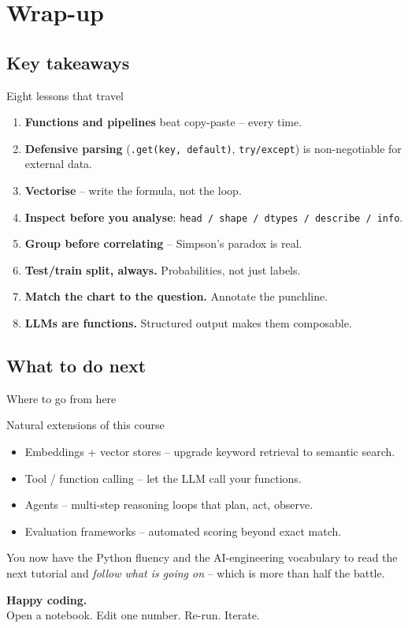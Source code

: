 \documentclass[aspectratio=169,11pt]{beamer}
\begin{document}
\section{Wrap-up}

\subsection{Key takeaways}

\begin{frame}{Eight lessons that travel}
  \begin{enumerate}
    \item \textbf{Functions and pipelines} beat copy-paste -- every time.
    \item \textbf{Defensive parsing} (\texttt{.get(key, default)}, \texttt{try/except}) is non-negotiable for external data.
    \item \textbf{Vectorise} -- write the formula, not the loop.
    \item \textbf{Inspect before you analyse}: \texttt{head / shape / dtypes / describe / info}.
    \item \textbf{Group before correlating} -- Simpson's paradox is real.
    \item \textbf{Test/train split, always.} Probabilities, not just labels.
    \item \textbf{Match the chart to the question.} Annotate the punchline.
    \item \textbf{LLMs are functions.} Structured output makes them composable.
  \end{enumerate}
\end{frame}

\subsection{What to do next}

\begin{frame}{Where to go from here}
  \begin{block}{Natural extensions of this course}
    \begin{itemize}
      \item Embeddings + vector stores -- upgrade keyword retrieval to semantic search.
      \item Tool / function calling -- let the LLM call your functions.
      \item Agents -- multi-step reasoning loops that plan, act, observe.
      \item Evaluation frameworks -- automated scoring beyond exact match.
    \end{itemize}
  \end{block}
  \vspace{6pt}
  You now have the Python fluency and the AI-engineering vocabulary to read the
  next tutorial and \emph{follow what is going on} -- which is more than half
  the battle.
\end{frame}

\begin{frame}
  \begin{center}
    {\Huge\bfseries Happy coding.}\\[8pt]
    \large Open a notebook. Edit one number. Re-run. Iterate.
  \end{center}
\end{frame}
\end{document}
